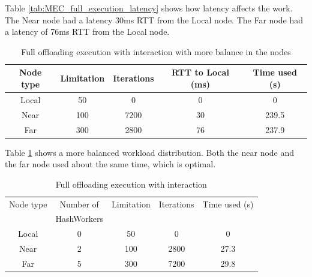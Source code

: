 Table \ref{tab:MEC_full_execution_latency} shows how latency affects the work. The Near node had a latency 30ms RTT from the Local node. The Far node had a latency of 76ms RTT from the Local node.

\begin{table}[h!]
    \centering
    \begin{tabular}[c]{|c|c|c|c|c|}
        \hline
        Node type & Limitation & Iterations & RTT to Local (ms)& Time used (s)\\
        \hline
        \hline
        Local & 50 & 0 & 0 & 0 \\
        \hline
        Near & 100 & 7200 & 30 & 239.5 \\
        \hline
        Far & 300 & 2800 & 76 & 237.9 \\
        \hline
    \end{tabular}
    \caption{Full offloading execution with interaction with more balance in the nodes}
    \label{tab:MEC_full_execution_latency_balance}
\end{table}

Table \ref{tab:MEC_full_execution_latency_balance} shows a more balanced workload distribution. Both the near node and the far node used about the same time, which is optimal.



\begin{table}[h!]
    \centering
    \begin{tabular}[c]{|c|c|c|c|c|}
        \hline
        Node type & Number of & Limitation & Iterations & Time used (s)\\
         & HashWorkers & & & \\
        \hline
        \hline
        Local & 0 & 50 & 0 & 0 \\
        \hline
        Near & 2 & 100 & 2800 & 27.3 \\
        \hline
        Far & 5 & 300 & 7200 & 29.8 \\
        \hline
    \end{tabular}
    \caption{Full offloading execution with interaction}
    \label{tab:MEC_full_execution_latency_multiple}
\end{table}




